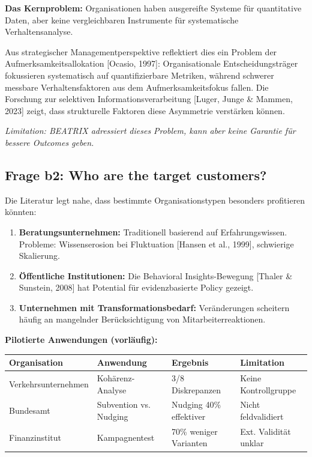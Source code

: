 \documentclass[11pt,a4paper]{article}
\newcommand{\limitation}[1]{\textcolor{limitation}{\textit{Limitation: #1}}}
\newcommand{\evidence}[1]{\textcolor{fehrgray}{[#1]}}
\begin{document}
\textbf{Das Kernproblem:} Organisationen haben ausgereifte Systeme für quantitative Daten, aber keine vergleichbaren Instrumente für systematische Verhaltensanalyse.

Aus strategischer Managementperspektive reflektiert dies ein Problem der Aufmerksamkeitsallokation \evidence{Ocasio, 1997}: Organisationale Entscheidungsträger fokussieren systematisch auf quantifizierbare Metriken, während schwerer messbare Verhaltensfaktoren aus dem Aufmerksamkeitsfokus fallen. Die Forschung zur selektiven Informationsverarbeitung \evidence{Luger, Junge \& Mammen, 2023} zeigt, dass strukturelle Faktoren diese Asymmetrie verstärken können.

\limitation{BEATRIX adressiert dieses Problem, kann aber keine Garantie für bessere Outcomes geben.}

\subsection{Frage b2: Who are the target customers?}

Die Literatur legt nahe, dass bestimmte Organisationstypen besonders profitieren könnten:

\begin{enumerate}[leftmargin=2em]
    \item \textbf{Beratungsunternehmen:} Traditionell basierend auf Erfahrungswissen. Probleme: Wissenserosion bei Fluktuation \evidence{Hansen et al., 1999}, schwierige Skalierung.

    \item \textbf{Öffentliche Institutionen:} Die Behavioral Insights-Bewegung \evidence{Thaler \& Sunstein, 2008} hat Potential für evidenzbasierte Policy gezeigt.

    \item \textbf{Unternehmen mit Transformationsbedarf:} Veränderungen scheitern häufig an mangelnder Berücksichtigung von Mitarbeiterreaktionen.
\end{enumerate}

\textbf{Pilotierte Anwendungen (vorläufig):}

\begin{table}[h]
\centering
\begin{tabular}{@{}L{3cm}L{4cm}L{3.5cm}L{3cm}@{}}
\toprule
\textbf{Organisation} & \textbf{Anwendung} & \textbf{Ergebnis} & \textbf{Limitation} \\
\midrule
Verkehrsunternehmen & Kohärenz-Analyse & 3/8 Diskrepanzen & Keine Kontrollgruppe \\
Bundesamt & Subvention vs. Nudging & Nudging 40\% effektiver & Nicht feldvalidiert \\
Finanzinstitut & Kampagnentest & 70\% weniger Varianten & Ext. Validität unklar \\
\bottomrule
\end{tabular}
\end{table}
\end{document}
